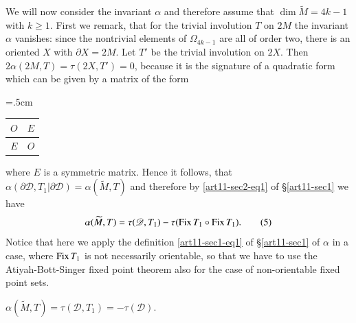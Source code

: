 We will now consider the invariant $\alpha$ and therefore assume that $\dim \widetilde{M}=4k-1$ with $k\geq 1$. First we remark, that for the trivial involution $T$ on $2M$ the invariant $\alpha$ vanishes: since the nontrivial elements of $\Omega_{4k-1}$ are all of order two, there is an oriented $X$ with $\partial X=2M$. Let $T'$ be the trivial involution on $2X$. Then $2\alpha(2M,T)=\tau(2X,T')=0$, because it is the signature of a quadratic form which can be given by a matrix of the form
\begin{center}
\tabcolsep=.5cm
\renewcommand{\arraystretch}{2}
\begin{tabular}{|c|c|}
\hline
$O$ & $E$\\
\hline
$E$ & $O$\\
\hline
\end{tabular}
\end{center}
where $E$ is a symmetric matrix. Hence it follows, that $\alpha(\partial \mathscr{D},T_{1}|\partial \mathscr{D})=\alpha(\widetilde{M},T)$ and therefore by \eqref{art11-sec2-eq1} of \S\ref{art11-sec1} we have
\begin{equation*}
\alpha(\widetilde{M},T)=\tau(\mathscr{D},T_{1})-\tau(\operatorname{\mathrm{Fix}} T_{1}\circ \operatorname{\mathrm{Fix}} T_{1}).\tag{5}\label{art11-sec2-eq5}
\end{equation*}
Notice that here we apply the definition \eqref{art11-sec1-eq1} of \S\ref{art11-sec1} of $\alpha$ in a case, where $\operatorname{\mathrm{Fix}} T_{1}$ is not necessarily orientable, so that we have to use the Atiyah-Bott-Singer fixed point theorem also for the case of non-orientable fixed point sets.

\begin{prop*}
$\alpha(\widetilde{M},T)=\tau(\mathscr{D},T_{1})=-\tau(\mathscr{D})$.
\end{prop*}

